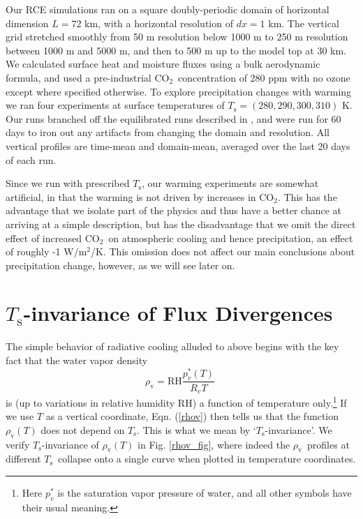 \documentclass[10pt]{article}
\newcommand{\beqn}{\begin{equation}}
\newcommand{\eeqn}{\end{equation}}
\newcommand{\eqnref}[1]{(\ref{#1})}
\newcommand{\cotwo}{\ensuremath{\mathrm{CO_2}}}
\newcommand{\Wmsq}{\ensuremath{\mathrm{W/m^2}}}
\newcommand{\rhov}{\ensuremath{\rho_\mathrm{v}}}
\newcommand{\Ts}{\ensuremath{T_\mathrm{s}}}
\newcommand{\RH}{\ensuremath{\mathrm{RH}}}
\begin{document}
	Our RCE simulations ran on a square doubly-periodic domain of horizontal dimension $L=72$ km, with  a horizontal resolution of $dx=1$ km. The vertical grid stretched smoothly from 50 m resolution below 1000 m to 250 m resolution between 1000 m and 5000 m, and then to 500 m up to the model top at  30 km. We calculated surface heat and moisture fluxes using a bulk aerodynamic formula, and used a pre-industrial \cotwo\  concentration of 280 ppm with no ozone except where specified otherwise. To explore precipitation changes  with warming we ran four experiments at surface temperatures of $\Ts=(280,290,300,310)$ K. Our runs branched off the equilibrated runs described in \cite{romps2014}, and were run for 60 days  to iron out any artifacts from changing the domain and resolution. All vertical profiles are time-mean and domain-mean, averaged over the last 20 days of each run. 

Since we run with prescribed \Ts, our warming experiments are somewhat artificial, in that the warming is not driven by increases in \cotwo. This has the advantage that we isolate part of the physics and thus have a better chance at arriving at a simple description, but has the disadvantage that we omit the direct effect of increased \cotwo\ on atmospheric cooling and hence precipitation, an effect of roughly -1 \Wmsq/K. This omission does not affect our main conclusions about precipitation change, however, as we will see later on.

\section{\Ts-invariance of Flux Divergences}
The simple behavior of radiative cooling alluded to above begins with the key fact that  the water vapor density 
	\beqn
		\rhov =  \RH\frac{p_v^*(T)}{R_ vT} \; 
	\label{rhov}
	\eeqn
	 is (up to variations in relative humidity \RH) a function of temperature only.\footnote{Here $p_v^*$  is the saturation vapor pressure of water, and all other symbols have their usual meaning.} If we use $T$ as a vertical coordinate,  Eqn. \eqnref{rhov} then tells us that the function $\rhov(T)$ does not depend on \Ts. This is what we mean by `\Ts-invariance'. We verify \Ts-invariance of $\rhov(T)$  in Fig. \ref{rhov_fig}, where indeed  the \rhov\ profiles at different \Ts\ collapse onto a single curve when plotted in temperature coordinates.
	 
\end{document}
